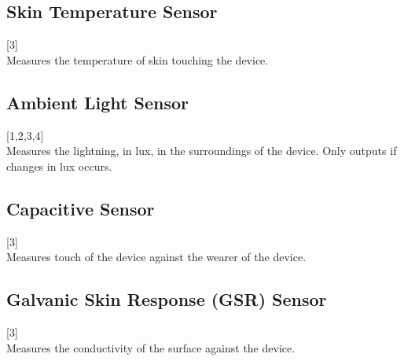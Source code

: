 \subsection{Skin Temperature Sensor}
\label{sub:skin_temperature_sensor}
[3] \\
Measures the temperature of skin touching the device.

\subsection{Ambient Light Sensor}
\label{sub:ambient_light_sensor}
[1,2,3,4] \\
Measures the lightning, in lux, in the surroundings of the device. Only outputs if changes in lux occurs.

\subsection{Capacitive Sensor}
\label{sub:capacitive_sensor}
[3] \\
Measures touch of the device against the wearer of the device.

\subsection{Galvanic Skin Response (GSR) Sensor}
\label{sub:galvanic_skin_respons_}
[3] \\
Measures the conductivity of the surface against the device.
